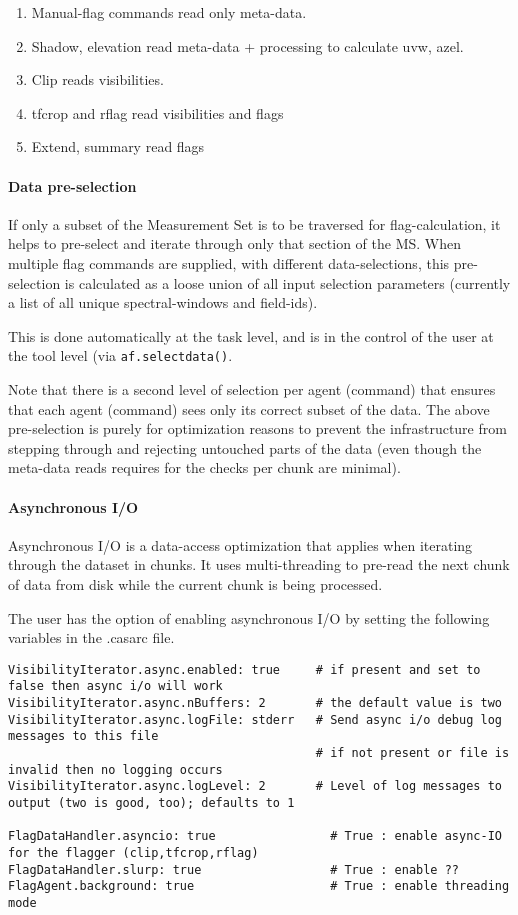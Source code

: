 \begin{enumerate}
\item  Manual-flag commands read only meta-data.
\item  Shadow, elevation read meta-data + processing to calculate uvw, azel.
\item  Clip reads visibilities.
\item  tfcrop and rflag read visibilities and flags
\item Extend, summary read flags
\end{enumerate}



\paragraph{Data pre-selection}
If only a subset of the Measurement Set is to be traversed for flag-calculation,
it helps to pre-select and iterate through only that section of the MS.  
When multiple flag commands are supplied, with different data-selections, 
this pre-selection is calculated as a loose union of all input selection parameters
(currently a list of all unique spectral-windows and field-ids).

This is done automatically at the task level, and is in the control of the user at the 
tool level (via {\tt af.selectdata()}.

Note that there is a second level of selection per agent (command) that ensures
that each agent (command) sees only its correct subset of the data. 
The above pre-selection is purely for optimization reasons to prevent the infrastructure
from stepping through and rejecting untouched parts of the data (even though the
meta-data reads requires for the checks per chunk are minimal). 

\paragraph{Asynchronous I/O}
Asynchronous I/O is a data-access optimization that applies when iterating through the
dataset in chunks.  It uses multi-threading to pre-read the next chunk of data from disk
while the current chunk is being processed.

The user has the option of enabling asynchronous I/O by setting the following 
variables in the .casarc file. 

\begin{verbatim}
VisibilityIterator.async.enabled: true     # if present and set to false then async i/o will work
VisibilityIterator.async.nBuffers: 2       # the default value is two
VisibilityIterator.async.logFile: stderr   # Send async i/o debug log messages to this file
                                           # if not present or file is invalid then no logging occurs
VisibilityIterator.async.logLevel: 2       # Level of log messages to output (two is good, too); defaults to 1

FlagDataHandler.asyncio: true                # True : enable async-IO for the flagger (clip,tfcrop,rflag)
FlagDataHandler.slurp: true                  # True : enable ??
FlagAgent.background: true                   # True : enable threading mode
\end{verbatim}

